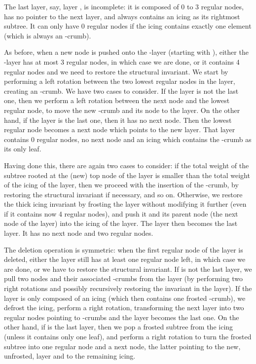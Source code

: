 \documentclass[11pt]{article}
\begin{document}
The last layer, say, layer , is incomplete: it is composed of 0 to 3
regular nodes, has no pointer to the next layer, and always contains an
icing as its rightmost subtree. It can only have 0 regular nodes if the
icing contains exactly one element (which is always an -crumb).

As before, when a new node is pushed onto the -layer (starting with
), 
either the -layer has at most 3 regular nodes, in which case we are
done, or it contains 4 regular nodes and we need to restore the structural
invariant.  We start by performing a left rotation between the two
lowest regular nodes in the layer, creating an -crumb.  We have
two cases to consider. If the  layer is not the last one, then
we perform a left rotation between the next node and the lowest regular
node, to move the new -crumb and its node to the 
layer.  On the other hand, if the  layer is the last one, then
it has no next node. Then the lowest regular node becomes a next node
which points to the new  layer. That  layer
contains 0 regular nodes, no next node and an icing which contains the
-crumb as its only leaf.

Having done this, there are again two cases to consider: if the total
weight of the subtree rooted at the (new) top node of the 
layer is smaller than the total weight of the icing of the 
layer, then we proceed with the insertion of the -crumb, by
restoring the structural invariant if necessary, and so on. Otherwise, we restore
the thick icing invariant by frosting the
 layer without modifying it further (even if it contains now
4 regular nodes), and push it and its parent node (the next node of the
 layer) into the icing of the  layer. The  layer
then becomes the last layer. It has no next node and two regular nodes.

The deletion operation is symmetric: when the first regular node of the
 layer is deleted, either the layer still has at least one
regular node left, in which case we are done, or we have to restore the
structural invariant.  If  is not the last layer, we pull two nodes and their
associated -crumbs from the  layer (by performing two
right rotations and possibly recursively restoring the invariant in the
 layer).  If the  layer is only composed of an
icing (which then contains one frosted -crumb), we defrost the
icing, perform a right rotation, transforming the next layer into two
regular nodes pointing to -crumbs and the  layer becomes the
last one.  On the other hand, if  is the last layer, then we pop a
frosted subtree from the icing (unless it contains only one leaf), and
perform a right rotation to turn the frosted subtree into one regular
node and a next node, the latter pointing to the new, unfrosted,
 layer and to the remaining icing.
\end{document}
